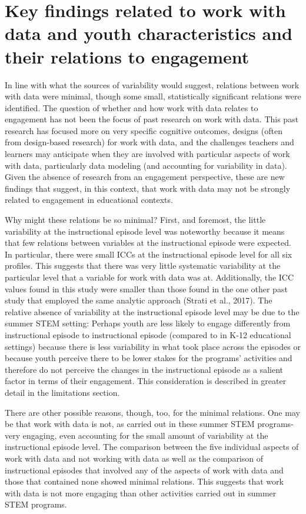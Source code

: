 \documentclass[]{book}
\theoremstyle{definition}
\theoremstyle{definition}
\theoremstyle{definition}
\theoremstyle{remark}
\begin{document}
\section{Key findings related to work with data and youth
characteristics and their relations to
engagement}\label{key-findings-related-to-work-with-data-and-youth-characteristics-and-their-relations-to-engagement}

In line with what the sources of variability would suggest, relations
between work with data were minimal, though some small, statistically
significant relations were identified. The question of whether and how
work with data relates to engagement has not been the focus of past
research on work with data. This past research has focused more on very
specific cognitive outcomes, designs (often from design-based research)
for work with data, and the challenges teachers and learners may
anticipate when they are involved with particular aspects of work with
data, particularly data modeling (and accounting for variability in
data). Given the absence of research from an engagement perspective,
these are new findings that suggest, in this context, that work with
data may not be strongly related to engagement in educational contexts.

Why might these relations be so minimal? First, and foremost, the little
variability at the instructional episode level was noteworthy because it
means that few relations between variables at the instructional episode
were expected. In particular, there were small ICCs at the instructional
episode level for all six profiles. This suggests that there was very
little systematic variability at the particular level that a variable
for work with data was at. Additionally, the ICC values found in this
study were smaller than those found in the one other past study that
employed the same analytic approach (Strati et al., 2017). The relative
absence of variability at the instructional episode level may be due to
the summer STEM setting: Perhaps youth are less likely to engage
differently from instructional episode to instructional episode
(compared to in K-12 educational settings) because there is less
variability in what took place across the episodes or because youth
perceive there to be lower stakes for the programs' activities and
therefore do not perceive the changes in the instructional episode as a
salient factor in terms of their engagement. This consideration is
described in greater detail in the limitations section.

There are other possible reasons, though, too, for the minimal
relations. One may be that work with data is not, as carried out in
these summer STEM programs- very engaging, even accounting for the small
amount of variability at the instructional episode level. The comparison
between the five individual aspects of work with data and not working
with data as well as the comparison of instructional episodes that
involved any of the aspects of work with data and those that contained
none showed minimal relations. This suggests that work with data is not
more engaging than other activities carried out in summer STEM programs.
\end{document}
